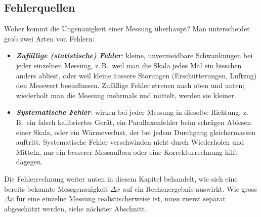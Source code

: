 \documentclass[11pt,a4paper]{article}
\begin{document}
\subsection{Fehlerquellen}
Woher kommt die Ungenauigkeit einer Messung überhaupt? Man unterscheidet grob zwei Arten von Fehlern:
\begin{itemize}
  \item \textbf{\emph{Zufällige (statistische) Fehler}}: kleine, unvermeidbare Schwankungen bei jeder einzelnen Messung, z.\,B.\ weil man die Skala jedes Mal ein bisschen anders abliest, oder weil kleine äussere Störungen (Erschütterungen, Luftzug) den Messwert beeinflussen. Zufällige Fehler streuen nach oben und unten; wiederholt man die Messung mehrmals und mittelt, werden sie kleiner.
  \item \textbf{\emph{Systematische Fehler}}: wirken bei jeder Messung in dieselbe Richtung, z.\,B.\ ein falsch kalibriertes Gerät, ein Parallaxenfehler beim schrägen Ablesen einer Skala, oder ein Wärmeverlust, der bei jedem Durchgang gleichermassen auftritt. Systematische Fehler verschwinden nicht durch Wiederholen und Mitteln, nur ein besserer Messaufbau oder eine Korrekturrechnung hilft dagegen.
\end{itemize}
Die Fehlerrechnung weiter unten in diesem Kapitel behandelt, wie sich eine bereits bekannte Messgenauigkeit $\Delta x$ auf ein Rechenergebnis auswirkt. Wie gross $\Delta x$ für eine einzelne Messung realistischerweise ist, muss zuerst separat abgeschätzt werden, siehe nächster Abschnitt.
\end{document}
